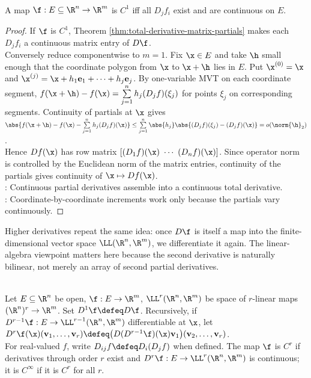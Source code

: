 \begin{theorem} \label{thm:c1-iff-continuous-partials} \\
A map $\f:E\subseteq\R^n\to\R^m$ is $C^1$ iff all $D_jf_i$ exist and are continuous on $E$.
\begin{proof}
If $\f$ is $C^1$, Theorem \ref{thm:total-derivative-matrix-partials} makes each $D_jf_i$ a continuous matrix entry of $D\f$.\\
Conversely reduce componentwise to $m=1$. Fix $\x\in E$ and take $\h$ small enough that the coordinate polygon from $\x$ to $\x+\h$ lies in $E$. Put $\x^{(0)}=\x$ and $\x^{(j)}=\x+h_1\mathbf{e}_1+\cdots+h_j\mathbf{e}_j$. By one-variable MVT on each coordinate segment, $f(\x+\h)-f(\x)=\sum\limits_{j=1}^{n}h_j(D_jf)(\xi_j)$ for points $\xi_j$ on corresponding segments. Continuity of partials at $\x$ gives $\abs{f(\x+\h)-f(\x)-\sum\limits_{j=1}^{n}h_j(D_jf)(\x)} \leq \sum\limits_{j=1}^{n}\abs{h_j}\abs{(D_jf)(\xi_j)-(D_jf)(\x)} =o(\norm{\h}_2)$.\\
Hence $Df(\x)$ has row matrix $[(D_1f)(\x)\ \cdots\ (D_nf)(\x)]$. Since operator norm is controlled by the Euclidean norm of the matrix entries, continuity of the partials gives continuity of $\x\mapsto Df(\x)$.\\
: Continuous partial derivatives assemble into a continuous total derivative.\\
: Coordinate-by-coordinate increments work only because the partials vary continuously.
\end{proof}
\end{theorem}

Higher derivatives repeat the same idea: once $D\f$ is itself a map into the finite-dimensional vector space $\LL(\R^n,\R^m)$, we differentiate it again. The linear-algebra viewpoint matters here because the second derivative is naturally bilinear, not merely an array of second partial derivatives.

\begin{definition} \label{def:higher-order-partials-and-c2} \\
Let $E\subseteq\R^n$ be open, $\f:E\to\R^m$, $\LL^r(\R^n,\R^m)$ be space of $r$-linear maps $(\R^n)^r\to\R^m$. Set $D^1\f\defeq D\f$. Recursively, if $D^{r-1}\f:E\to\LL^{r-1}(\R^n,\R^m)$ differentiable at $\x$, let $D^r\f(\x)(\mathbf{v}_1,\ldots,\mathbf{v}_r) \defeq \bigl(D(D^{r-1}\f)(\x)\mathbf{v}_1\bigr)(\mathbf{v}_2,\ldots,\mathbf{v}_r)$.\\
For real-valued $f$, write $D_{ij}f\defeq D_i(D_jf)$ when defined. The map $\f$ is $C^r$ if derivatives through order $r$ exist and $D^r\f:E\to\LL^r(\R^n,\R^m)$ is continuous; it is $C^\infty$ if it is $C^r$ for all $r$.
\end{definition}

